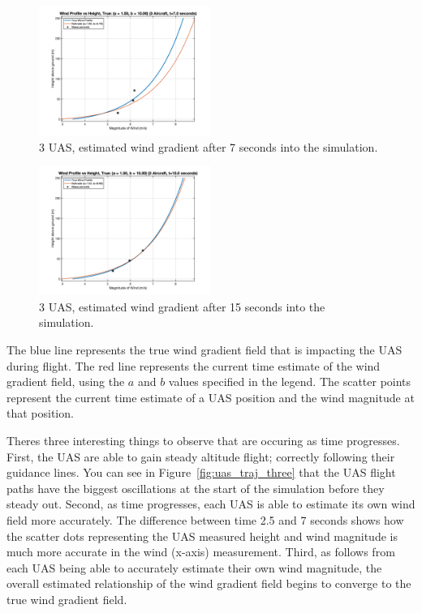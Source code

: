 \begin{figure}[h]
    \centering
    \includegraphics[width=0.5\textwidth]{images/3_uas_7_sec.png}
    \caption{3 UAS, estimated wind gradient after 7 seconds into the simulation.}
    \label{fig:uas_traj_three_75}
\end{figure}

\begin{figure}[h]
    \centering
    \includegraphics[width=0.5\textwidth]{images/3_uas_15_sec.png}
    \caption{3 UAS, estimated wind gradient after 15 seconds into the simulation.}
    \label{fig:uas_traj_three_15}
\end{figure}

The blue line represents the true wind gradient field that is impacting the UAS during flight.
The red line represents the current time estimate of the wind gradient field, using the $a$ and $b$ values specified in the legend.
The scatter points represent the current time estimate of a UAS position and the wind magnitude at that position.

Theres three interesting things to observe that are occuring as time progresses.
First, the UAS are able to gain steady altitude flight; correctly following their guidance lines. 
You can see in Figure~\ref{fig:uas_traj_three} that the UAS flight paths have the biggest oscillations at the start of the simulation before they steady out.
Second, as time progresses, each UAS is able to estimate its own wind field more accurately.
The difference between time 2.5 and 7 seconds shows how the scatter dots representing the UAS measured height and wind magnitude is much more accurate in the wind (x-axis) measurement.
Third, as follows from each UAS being able to accurately estimate their own wind magnitude, the overall estimated relationship of the wind gradient field begins to converge to the true wind gradient field.

